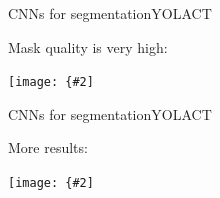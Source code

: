 \documentclass[aspectratio=169]{beamer}
\newcommand{\myfig}[3]{\centerline{\texttt{[image: \{\#2]}}}
\begin{document}
\begin{frame}{CNNs for segmentation}{YOLACT}

  Mask quality is very high:

  \medskip
  
  \myfig{5in}{bolya-fig7}{Bolya, Zhou, Xiao, and Lee (2019), Fig.\ 7}

\end{frame}


\begin{frame}{CNNs for segmentation}{YOLACT}

  More results:

  \medskip
  
  \myfig{3.3in}{bolya-fig8}{Bolya, Zhou, Xiao, and Lee (2019), Fig.\ 8}

\end{frame}
\end{document}
